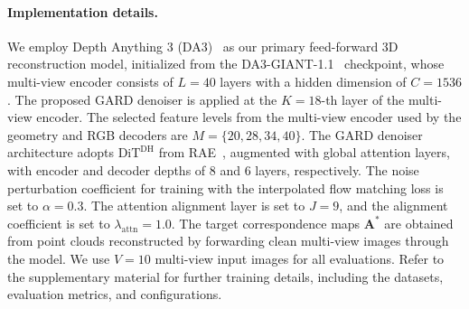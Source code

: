 


\paragraph{Implementation details.}
We employ Depth Anything 3 (DA3)~\cite{depthanything3} as our primary feed-forward 3D reconstruction model, initialized from the DA3-GIANT-1.1~\cite{depthanything3} checkpoint, whose multi-view encoder consists of $L=40$ layers with a hidden dimension of $C=1536$. The proposed GARD denoiser is applied at the $K=18$-th layer of the multi-view encoder. The selected feature levels from the multi-view encoder used by the geometry and RGB decoders are $M=\{20, 28, 34, 40\}$. The GARD denoiser architecture adopts $\text{DiT}^{\text{DH}}$ from RAE~\cite{zheng2025diffusion}, augmented with global attention layers, with encoder and decoder depths of 8 and 6 layers, respectively. The noise perturbation coefficient for training with the interpolated flow matching loss is set to $\alpha=0.3$. The attention alignment layer is set to $J=9$, and the alignment coefficient is set to $\lambda_\text{attn}=1.0$. The target correspondence maps $\mathbf{A}^{*}$ are obtained from point clouds reconstructed by forwarding clean multi-view images through the model. We use $V=10$ multi-view input images for all evaluations. Refer to the supplementary material for further training details, including the datasets, evaluation metrics, and configurations.




